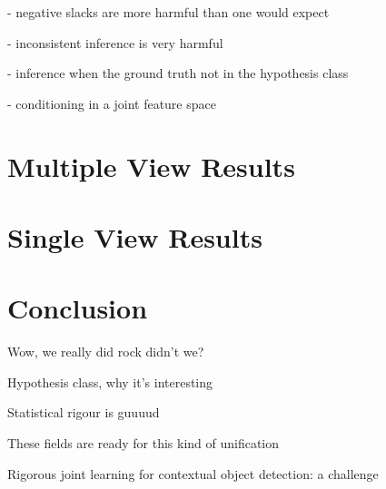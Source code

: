- negative slacks are more harmful than one would expect

- inconsistent inference is very harmful

- inference when the ground truth not in the hypothesis class

- conditioning in a joint feature space

\section{Multiple View Results}
\label{sec:mv-results}

\section{Single View Results}
\label{sec:sv-results}

\section{Conclusion}
\label{sec:conclusion}

Wow, we really did rock didn't we?

Hypothesis class, why it's interesting

Statistical rigour is guuuud

These fields are ready for this kind of unification

Rigorous joint learning for contextual object detection: a challenge



